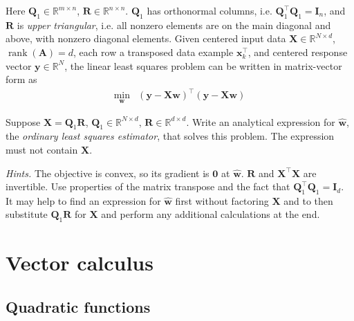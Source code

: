 \documentclass{article}
\numberwithin{equation}{section}
\begin{document}
Here $ \mathbf{Q}_1 \in \mathbb{R}^{m \times n} $, $ \mathbf{R} \in
\mathbb{R}^{n \times n} $. $ \mathbf{Q}_1 $ has orthonormal columns, i.e.
$ \mathbf{Q}_1^\top\mathbf{Q}_1 = \mathbf{I}_n $, and $ \mathbf{R} $ is
\textit{upper triangular}, i.e. all nonzero elements are on the main diagonal
and above, with nonzero diagonal elements. Given centered input data
$ \mathbf{X} \in \mathbb{R}^{N \times d} $,
$ \operatorname{rank}(\mathbf{A}) = d $, each row a transposed data example
$ \mathbf{x}_k^\top $, and centered\footnotemark{} response vector $ \mathbf{y} \in \mathbb{R}^N $, the linear least squares
problem can be written in matrix-vector form as
\begin{equation*}
    \begin{array}{ll}
        \displaystyle\min_\mathbf{w} &
        (\mathbf{y} - \mathbf{Xw})^\top(\mathbf{y} - \mathbf{Xw})
    \end{array}
\end{equation*}

Suppose $ \mathbf{X} = \mathbf{Q}_1\mathbf{R} $, $ \mathbf{Q}_1 \in
\mathbb{R}^{N \times d} $, $ \mathbf{R} \in \mathbb{R}^{d \times d} $. Write
an analytical expression for $ \hat{\mathbf{w}} $, the \textit{ordinary least
squares estimator}, that solves this problem. The expression must not contain
$ \mathbf{X} $.

\medskip

\textit{Hints.} The objective is convex, so its gradient is $ \mathbf{0} $ at
$ \hat{\mathbf{w}} $. $ \mathbf{R} $ and $ \mathbf{X}^\top\mathbf{X} $ are
invertible. Use properties of the matrix transpose and the fact that
$ \mathbf{Q}_1^\top\mathbf{Q}_1 = \mathbf{I}_d $. It may help to find an
expression for $ \hat{\mathbf{w}} $ first without factoring $ \mathbf{X} $
and to then substitute $ \mathbf{Q}_1\mathbf{R} $ for $ \mathbf{X} $ and
perform any additional calculations at the end.

\section{Vector calculus}

\subsection{Quadratic functions}
\end{document}
